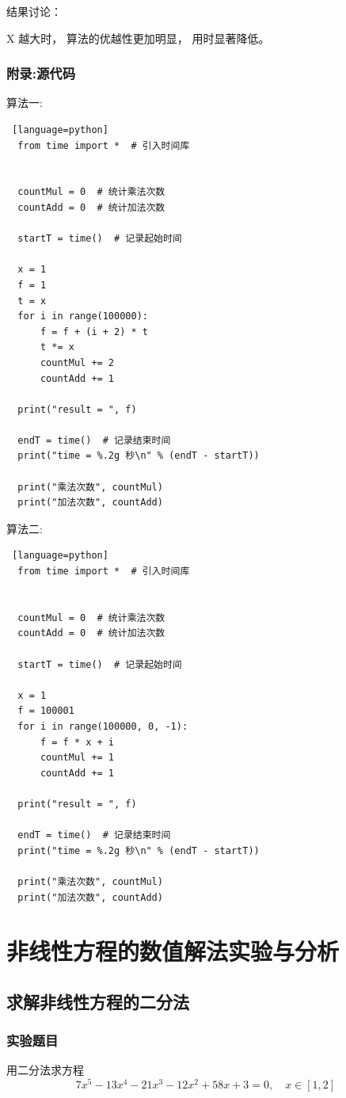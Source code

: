 \documentclass[UTF8]{ctexart}
\begin{document}
结果讨论：

X 越大时， 算法的优越性更加明显， 用时显著降低。

\subsubsection{附录:源代码}
算法一:
\begin{lstlisting} [language=python]
  from time import *  # 引入时间库


  countMul = 0  # 统计乘法次数
  countAdd = 0  # 统计加法次数
  
  startT = time()  # 记录起始时间
  
  x = 1
  f = 1
  t = x
  for i in range(100000):
      f = f + (i + 2) * t
      t *= x
      countMul += 2
      countAdd += 1
  
  print("result = ", f)
  
  endT = time()  # 记录结束时间
  print("time = %.2g 秒\n" % (endT - startT))
  
  print("乘法次数", countMul)
  print("加法次数", countAdd)  
\end{lstlisting}

\quad

算法二:
\begin{lstlisting} [language=python]
  from time import *  # 引入时间库


  countMul = 0  # 统计乘法次数
  countAdd = 0  # 统计加法次数
  
  startT = time()  # 记录起始时间
  
  x = 1
  f = 100001
  for i in range(100000, 0, -1):
      f = f * x + i
      countMul += 1
      countAdd += 1
  
  print("result = ", f)
  
  endT = time()  # 记录结束时间
  print("time = %.2g 秒\n" % (endT - startT))
  
  print("乘法次数", countMul)
  print("加法次数", countAdd)  
\end{lstlisting}
\newpage

\section{非线性方程的数值解法实验与分析}
\subsection{求解非线性方程的二分法}
\subsubsection{实验题目}
用二分法求方程
$$
7 x^{5}-13 x^{4}-21 x^{3}-12 x^{2}+58 x+3=0, \quad x \in[1,2]
$$
\end{document}
